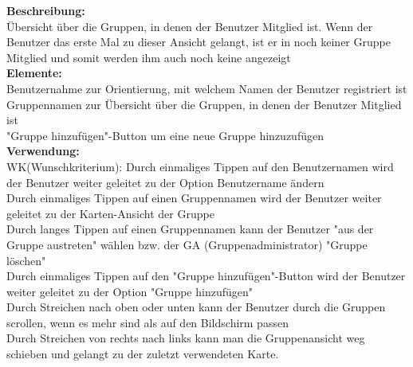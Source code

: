 \textbf{Beschreibung:}\\
Übersicht über die Gruppen, in denen der Benutzer Mitglied ist. Wenn der Benutzer das erste Mal zu dieser Ansicht gelangt, ist er in noch keiner Gruppe Mitglied und somit werden ihm auch noch keine angezeigt\\
\textbf{Elemente:}\\
Benutzernahme zur Orientierung, mit welchem Namen der Benutzer registriert ist\\
Gruppennamen zur Übersicht über die Gruppen, in denen der Benutzer Mitglied ist\\
"Gruppe hinzufügen"-Button um eine neue Gruppe hinzuzufügen\\
\textbf{Verwendung:}\\
WK(Wunschkriterium): Durch einmaliges Tippen auf den Benutzernamen wird der Benutzer weiter geleitet zu der Option Benutzername ändern\\
Durch einmaliges Tippen auf einen Gruppennamen wird der Benutzer weiter geleitet zu der Karten-Ansicht der Gruppe\\
Durch langes Tippen auf einen Gruppennamen kann der Benutzer "aus der Gruppe austreten" wählen bzw. der GA (Gruppenadministrator) "Gruppe löschen"\\
Durch einmaliges Tippen auf den "Gruppe hinzufügen"-Button wird der Benutzer weiter geleitet zu der Option "Gruppe hinzufügen"\\
Durch Streichen nach oben oder unten kann der Benutzer durch die Gruppen scrollen, wenn es mehr sind als auf den Bildschirm passen\\
Durch Streichen von rechts nach links kann man die Gruppenansicht weg schieben und gelangt zu der zuletzt verwendeten Karte.
\newpage


